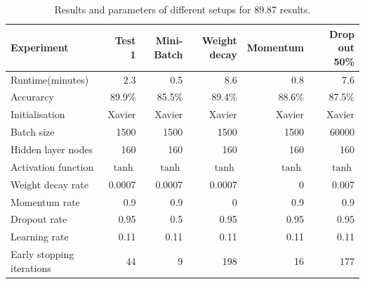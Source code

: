\begin{table}
\caption{Results and parameters of different setups for 89.87 results.}
{\footnotesize \centering
\begin{tabular}{@{}lrrrrr@{}}
\toprule
Experiment                & Test 1  & Mini-Batch & Weight decay & Momentum & Drop out 50\% \\ \midrule
Runtime(minutes)          & 2.3     & 0.5        & 8.6          & 0.8      & 7.6           \\
Accurarcy                 & 89.9\%  & 85.5\%     & 89.4\%       & 88.6\%   & 87.5\%        \\
Initialisation            & Xavier  & Xavier     & Xavier       & Xavier   & Xavier        \\
Batch size                & 1500    & 1500       & 1500         & 1500     & 60000         \\
Hidden layer nodes        & 160     & 160        & 160          & 160      & 160           \\
Activation function       & $\tanh$ & $\tanh$    & $\tanh$      & $\tanh$  & $\tanh$       \\
Weight decay rate         & 0.0007  & 0.0007     & 0.0007       & 0        & 0.007         \\
Momentum rate             & 0.9     & 0.9        & 0            & 0.9      & 0.9           \\
Dropout rate              & 0.95    & 0.5        & 0.95         & 0.95     & 0.95          \\
Learning rate             & 0.11    & 0.11       & 0.11         & 0.11     & 0.11          \\
Early stopping iterations & 44      & 9          & 198          & 16       & 177           \\ \bottomrule
\end{tabular}
}
\end{table}


